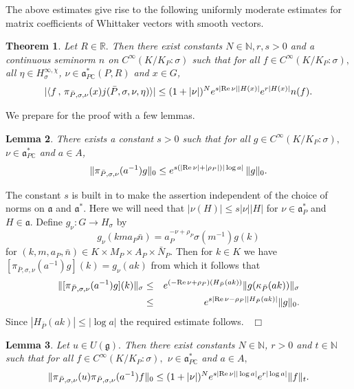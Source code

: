 \documentclass[12pt,a4paper]{article}
\newtheorem{Thm}{Theorem}
\newtheorem{Lemma}[Thm]{Lemma}
\newenvironment{thm}[0]{\begin{Thm}\noindent}%
{\end{Thm}}
\newenvironment{lemma}[0]{\begin{Lemma}\noindent}%
{\end{Lemma}}
\def\proof{\par\noindent{\it Proof.}{\ }{\ }}
\def\qed{~\hfill\hbox{$\Box$}\medbreak}
\def\msy#1{{\mathbb #1}}
\def\C{{\msy C}}
\def\N{{\msy N}}
\def\R{{\msy R}}
\def\gs{\sigma}
\def\got#1{\mathfrak #1}
\def\fa{{\got a}}
\def\fg{{\got g}}
\def\to{\rightarrow}
\def\Re{{\rm Re}\,}
\def\inp#1#2{\langle#1\,,\,#2\rangle}
\def\iC{{\scriptscriptstyle \C}}
\numberwithin{Thm}{section}
\numberwithin{equation}{section}
\def\faPdc{{\fa_{P\iC}^*}}
\def\faPd{{\fa_P^*}}
\numberwithin{equation}{section}
\def\fad{{\fa^*}}
\def\faPdc{\fa_{P\iC}^*}
\def\cchi{\chi}
\def\gsP{\gs}%
\begin{document}
The above estimates give rise to the following uniformly moderate estimates for matrix coefficients
of Whittaker vectors with smooth vectors. 

\begin{thm}
\label{t: uniformly moderate estimate}
Let $R \in \R.$ Then there exist constants $N \in \N, r, s > 0$ and a
continuous seminorm $n$ on $C^\infty(K/K_P:\gsP)$ such that 
for all $f \in C^\infty(K/K_P:\gsP),$  all $\eta \in H_\gs^{\infty, \cchi}$, $\nu \in \faPdc(P,R)$
and $x \in G$, 
$$ 
|\inp{f}{\pi_{\bar P, \gs, \nu}(x) j(\bar P, \gs, \nu,\eta)}| \leq  
(1 + |\nu|)^N e^{s|\Re \nu||H(x)|} e^{r|H(x)|}  n(f).
$$ 
\end{thm}

We prepare for the proof with a few lemmas.

\begin{lemma}
There exists a constant $s > 0$ such that for all $g \in C^\infty(K/K_P:\gsP),$  $\nu \in \faPdc$ and $a \in A$,
$$ 
\|\pi_{\bar P, \gs, \nu}(a^{-1}) g\|_0 \leq e^{s (|\Re \nu| + |\rho_P|)|\log a|}\, \|g\|_0.
$$ 
\end{lemma}

\proof 
The constant $s$ is built in to make the assertion independent of the choice of norms on $\fa$ and $\fad.$ 
Here we will need that $|\nu(H)|\leq s |\nu| |H|$ for $\nu \in \faPd$ and $H \in \fa.$ 
Define 
$g_\nu: G \to H_\gs$ by 
$$ 
g_\nu( k m a_P \bar n ) =  a_P^{- \nu + \rho_P} \gs(m^{-1}) g(k)
$$  
for $(k, m, a_P, \bar n) \in K \times M_P \times A_P \times \bar N_{P}.$ 
Then for $k \in K$ we have $[\pi_{\bar P, \gs, \nu}(a^{-1})g](k) = g_{\nu}(ak)$ from which it follows that
\begin{eqnarray*}
\|[\pi_{\bar P, \gs, \nu}(a^{-1})g](k)\|_\gs  & \leq & e^{(- \Re \nu +\rho_P)(H_{\bar P}(ak))}
 \|g(\kappa_{\bar P}(a k))\|_\gs \\
&\leq& e^{s |\Re \nu - \rho_P||H_{\bar P}(ak)|} \|g\|_0.
\end{eqnarray*}
Since $|H_{\bar P}(ak)| \leq |\log a|$ the required estimate follows.
\qed

\begin{lemma}
\label{l: estimate u a f}
Let $u \in U(\fg).$ Then there exist constants $N \in \N$, $r > 0$ and $t \in \N$ such that 
for all $f \in C^\infty(K/K_P:\gsP),$ $\nu \in \faPdc$ and $a \in A,$
$$ 
\|\pi_{\bar P, \gs, \nu}(u)\pi_{\bar P, \gs, \nu}(a^{-1}) f\|_0  \leq ( 1+ |\nu|)^N e^{s|\Re \nu||\log a|}e^{r|\log a|} \|f\|_{t}.
$$ 
\end{lemma}
\medbreak
\end{document}
